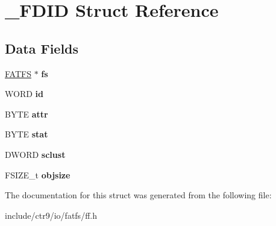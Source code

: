 \hypertarget{struct___f_d_i_d}{}\section{\+\_\+\+F\+D\+ID Struct Reference}
\label{struct___f_d_i_d}
\subsection*{Data Fields}
\begin{DoxyCompactItemize}
\item 
\hyperlink{struct_f_a_t_f_s}{F\+A\+T\+FS} $\ast$ {\bfseries fs}\hypertarget{struct___f_d_i_d_aefa4597d88e54bace32e6c15e11d9610}{}\label{struct___f_d_i_d_aefa4597d88e54bace32e6c15e11d9610}

\item 
W\+O\+RD {\bfseries id}\hypertarget{struct___f_d_i_d_a363d7bdab408418b911ac1502bc22ea6}{}\label{struct___f_d_i_d_a363d7bdab408418b911ac1502bc22ea6}

\item 
B\+Y\+TE {\bfseries attr}\hypertarget{struct___f_d_i_d_a6912cfc1ea914d7b68a18b846065d790}{}\label{struct___f_d_i_d_a6912cfc1ea914d7b68a18b846065d790}

\item 
B\+Y\+TE {\bfseries stat}\hypertarget{struct___f_d_i_d_a1a2ff09f2ef172772f4e7312070be708}{}\label{struct___f_d_i_d_a1a2ff09f2ef172772f4e7312070be708}

\item 
D\+W\+O\+RD {\bfseries sclust}\hypertarget{struct___f_d_i_d_ae2fbaaa31b5d12b333cb6d1ded099412}{}\label{struct___f_d_i_d_ae2fbaaa31b5d12b333cb6d1ded099412}

\item 
F\+S\+I\+Z\+E\+\_\+t {\bfseries objsize}\hypertarget{struct___f_d_i_d_a27039b8d89a4a62efabab36e6b303819}{}\label{struct___f_d_i_d_a27039b8d89a4a62efabab36e6b303819}

\end{DoxyCompactItemize}


The documentation for this struct was generated from the following file\+:\begin{DoxyCompactItemize}
\item 
include/ctr9/io/fatfs/ff.\+h\end{DoxyCompactItemize}
